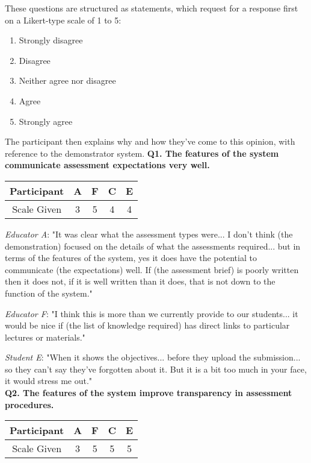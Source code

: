 These questions are structured as statements, which request for a response first on a Likert-type scale of 1 to 5:
\begin{enumerate}
	\setlength\itemsep{0em}
	\item Strongly disagree
	\item Disagree
	\item Neither agree nor disagree
	\item Agree
	\item Strongly agree
\end{enumerate}
The participant then explains why and how they've come to this opinion, with reference to the demonstrator system.
\newpage
\textbf{Q1. The features of the system communicate assessment expectations very well.}\\
\begin{table}[!ht]
	\centering
	\begin{tabular}{|c|c|c|c|c|}
		\hline
		Participant & A                       & F                   & C                        & E \\
		\hline
		Scale Given & \cellcolor{Dandelion}3 & \cellcolor{green}5 & \cellcolor{SpringGreen}4 & \cellcolor{SpringGreen}4 \\
		\hline
	\end{tabular}
\end{table}

\textit{Educator A}: "It was clear what the assessment types were... I don't think (the demonstration)
focused on the details of what the assessments required... but in terms of the features of the system,
yes it does have the potential to communicate (the expectations) well. If (the assessment brief) is
poorly written then it does not, if it is well written than it does, that is not down to the function of the system."

\textit{Educator F}: "I think this is more than we currently provide to our students... it would be nice if
(the list of knowledge required) has direct links to particular lectures or materials."

\textit{Student E}: "When it shows the objectives... before they upload the submission... 
so they can't say they've forgotten about it. But it is a bit too much in your face, it would stress me out."\\

\textbf{Q2. The features of the system improve transparency in assessment procedures.}\\
\begin{table}[!ht]
	\centering
	\begin{tabularx}{0.325\textwidth}{|c|c|c|c|c|}
		\hline
		Participant & A                      & F                  & C                  & E \\
		\hline
		Scale Given & \cellcolor{Dandelion}3 & \cellcolor{green}5 & \cellcolor{green}5 & \cellcolor{green}5 \\
		\hline
	\end{tabularx}
\end{table}


